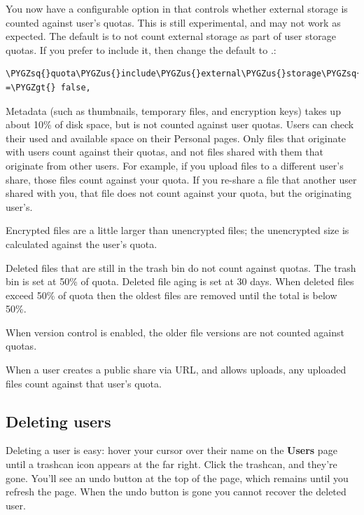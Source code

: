 \documentclass[letterpaper,10pt,english]{sphinxmanual}
\def\PYGZus{\char`\_}
\def\PYGZgt{\char`\>}
\def\PYGZsq{\char`\'}
\begin{document}
You now have a configurable option in  that controls whether
external storage is counted against user's quotas. This is still
experimental, and may not work as expected. The default is to not count
external storage as part of user storage quotas. If you prefer to include it,
then change the default  to .:

\begin{Verbatim}[commandchars=\\\{\}]
\PYGZsq{}quota\PYGZus{}include\PYGZus{}external\PYGZus{}storage\PYGZsq{} =\PYGZgt{} false,
\end{Verbatim}

Metadata (such as thumbnails, temporary files, and encryption keys) takes up
about 10\% of disk space, but is not counted against user quotas. Users can check
their used and available space on their Personal pages. Only files that
originate with users count against their quotas, and not files shared with them
that originate from other users. For example, if you upload files to a
different user's share, those files count against your quota. If you re-share a
file that another user shared with you, that file does not count against your
quota, but the originating user's.

Encrypted files are a little larger than unencrypted files; the unencrypted size
is calculated against the user's quota.

Deleted files that are still in the trash bin do not count against quotas. The
trash bin is set at 50\% of quota. Deleted file aging is set at 30 days. When
deleted files exceed 50\% of quota then the oldest files are removed until the
total is below 50\%.

When version control is enabled, the older file versions are not counted
against quotas.

When a user creates a public share via URL, and allows uploads, any uploaded
files count against that user's quota.


\subsection{Deleting users}
\label{configuration_user/user_configuration:deleting-users}
Deleting a user is easy: hover your cursor over their name on the \textbf{Users} page
until a trashcan icon appears at the far right. Click the trashcan, and they're
gone. You'll see an undo button at the top of the page, which remains until you
refresh the page. When the undo button is gone you cannot recover the deleted
user.
\end{document}
